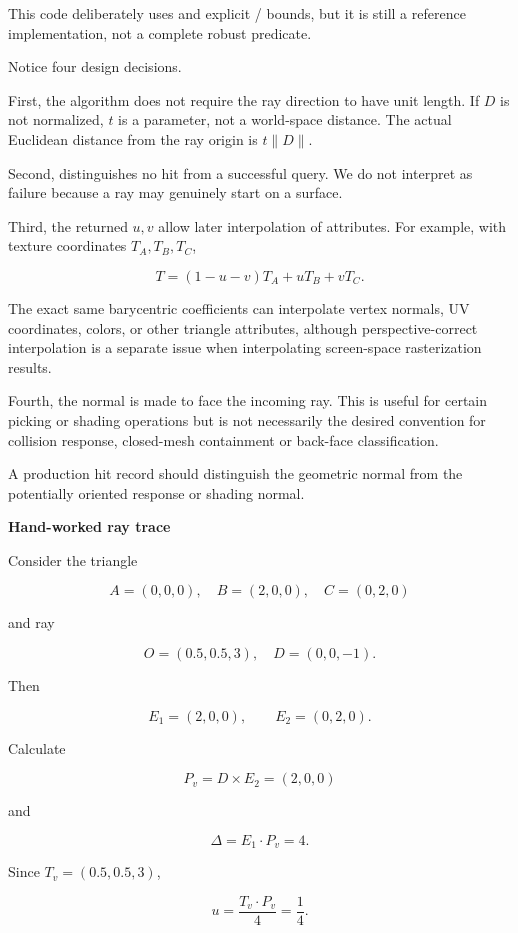 This code deliberately uses  and explicit / bounds, but it is still a reference implementation, not a complete robust predicate.

Notice four design decisions.

First, the algorithm does not require the ray direction to have unit length. If \(D\) is not normalized, \(t\) is a parameter, not a world-space distance. The actual Euclidean distance from the ray origin is \(t\|D\|\).

Second,  distinguishes no hit from a successful query. We do not interpret  as failure because a ray may genuinely start on a surface.

Third, the returned \(u,v\) allow later interpolation of attributes. For example, with texture coordinates \(T_A,T_B,T_C\),

\[
T=(1-u-v)T_A+uT_B+vT_C.
\]

The exact same barycentric coefficients can interpolate vertex normals, UV coordinates, colors, or other triangle attributes, although perspective-correct interpolation is a separate issue when interpolating screen-space rasterization results.

Fourth, the normal is made to face the incoming ray. This is useful for certain picking or shading operations but is not necessarily the desired convention for collision response, closed-mesh containment or back-face classification.

A production hit record should distinguish the geometric normal from the potentially oriented response or shading normal.

\textbf{Hand-worked ray trace}

Consider the triangle

\[
A=(0,0,0),\quad B=(2,0,0),\quad C=(0,2,0)
\]

and ray

\[
O=(0.5,0.5,3),\quad D=(0,0,-1).
\]

Then

\[
E_1=(2,0,0),\qquad E_2=(0,2,0).
\]

Calculate

\[
P_v=D\times E_2=(2,0,0)
\]

and

\[
\Delta=E_1\cdot P_v=4.
\]

Since \(T_v=(0.5,0.5,3)\),

\[
u=\frac{T_v\cdot P_v}{4}=\frac14.
\]

